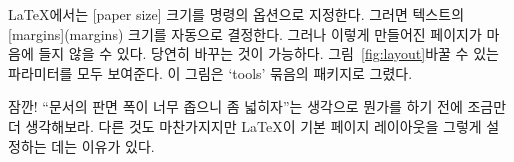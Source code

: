 \LaTeX 에서는 [paper size] 크기를  명령의 옵션으로 지정한다. 그러면 텍스트의 [margins](margins) 크기를 자동으로 결정한다. 그러나 이렇게 만들어진 페이지가 마음에 들지 않을 수 있다. 당연히 바꾸는 것이 가능하다.
그림~\ref{fig:layout}\는 바꿀 수 있는 파라미터를 모두 보여준다. 이 그림은 `tools' 묶음의  패키지로 그렸다.

\textsf{잠깐!} \hdots\hdots{} ``문서의 판면 폭이 너무 좁으니 좀 넓히자''는 생각으로 뭔가를 하기 전에 조금만 더 생각해보라.
다른 것도 마찬가지지만 \LaTeX 이 기본 페이지 레이아웃을 그렇게 설정하는 데는 이유가 있다.

